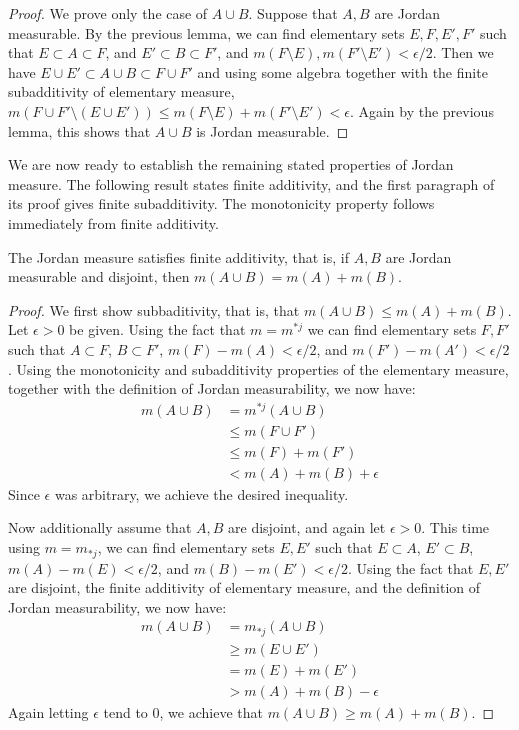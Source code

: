 \begin{proof}
  We prove only the case of $A\cup B$. Suppose that $A,B$ are Jordan measurable. By the previous lemma, we can find elementary sets $E,F,E',F'$ such that $E\subset A\subset F$, and $E'\subset B\subset F'$, and $m(F\setminus E),m(F'\setminus E')<\epsilon/2$. Then we have $E\cup E'\subset A\cup B\subset F\cup F'$ and using some algebra together with the finite subadditivity of elementary measure, $m(F\cup F'\setminus(E\cup E'))\leq m(F\setminus E)+m(F'\setminus E')<\epsilon$. Again by the previous lemma, this shows that $A\cup B$ is Jordan measurable.
\end{proof}

We are now ready to establish the remaining stated properties of Jordan measure. The following result states finite additivity, and the first paragraph of its proof gives finite subadditivity. The monotonicity property follows immediately from finite additivity.

\begin{thm}
  The Jordan measure satisfies finite additivity, that is, if $A,B$ are Jordan measurable and disjoint, then $m(A\cup B)=m(A)+m(B)$.
\end{thm}

\begin{proof}
  We first show subbaditivity, that is, that $m(A\cup B)\leq m(A)+m(B)$. Let $\epsilon>0$ be given. Using the fact that $m=m^{*j}$ we can find elementary sets $F,F'$ such that $A\subset F$, $B\subset F'$, $m(F)-m(A)<\epsilon/2$, and $m(F')-m(A')<\epsilon/2$. Using the monotonicity and subadditivity properties of the elementary measure, together with the definition of Jordan measurability, we now have:
  \begin{align*}
    m(A\cup B)&=m^{*j}(A\cup B)\\
              &\leq m(F\cup F')\\
              &\leq m(F)+m(F')\\
              &<m(A)+m(B)+\epsilon
  \end{align*}
  Since $\epsilon$ was arbitrary, we achieve the desired inequality.

  Now additionally assume that $A,B$ are disjoint, and again let $\epsilon>0$. This time using $m=m_{*j}$, we can find elementary sets $E,E'$ such that $E\subset A$, $E'\subset B$, $m(A)-m(E)<\epsilon/2$, and $m(B)-m(E')<\epsilon/2$. Using the fact that $E,E'$ are disjoint, the finite additivity of elementary measure, and the definition of Jordan measurability, we now have:
  \begin{align*}
    m(A\cup B)&=m_{*j}(A\cup B)\\
              &\geq m(E\cup E')\\
              &=m(E)+m(E')\\
              &>m(A)+m(B)-\epsilon
  \end{align*}
  Again letting $\epsilon$ tend to $0$, we achieve that $m(A\cup B)\geq m(A)+m(B)$.
\end{proof}


